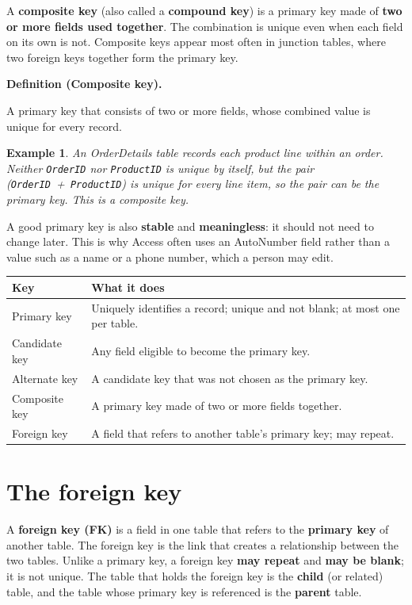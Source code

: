 \documentclass[11pt]{article}
\newtheorem{example}{Example}[section]
\newenvironment{definitionbox}[1]{%
  \par\noindent\textbf{Definition (#1).}\ \itshape
}{\par\vspace{0.3em}}
\begin{document}
A \textbf{composite key} (also called a \textbf{compound key}) is a primary key
made of \textbf{two or more fields used together}. The combination is unique
even when each field on its own is not. Composite keys appear most often in
junction tables, where two foreign keys together form the primary key.

\begin{definitionbox}{Composite key}
A primary key that consists of two or more fields, whose combined value is
unique for every record.
\end{definitionbox}

\begin{example}
An OrderDetails table records each product line within an order. Neither
\texttt{OrderID} nor \texttt{ProductID} is unique by itself, but the pair
(\texttt{OrderID}~+~\texttt{ProductID}) is unique for every line item, so the
pair can be the primary key. This is a composite key.
\end{example}

A good primary key is also \textbf{stable} and \textbf{meaningless}: it should
not need to change later. This is why Access often uses an AutoNumber field
rather than a value such as a name or a phone number, which a person may edit.

\begin{center}
\begin{tabular}{p{}p{}}
\toprule
\textbf{Key} & \textbf{What it does} \\
\midrule
Primary key & Uniquely identifies a record; unique and not blank; at most one per table. \\
Candidate key & Any field eligible to become the primary key. \\
Alternate key & A candidate key that was not chosen as the primary key. \\
Composite key & A primary key made of two or more fields together. \\
Foreign key & A field that refers to another table's primary key; may repeat. \\
\bottomrule
\end{tabular}
\end{center}

\section{The foreign key}
A \textbf{foreign key (FK)} is a field in one table that refers to the
\textbf{primary key} of another table. The foreign key is the link that
creates a relationship between the two tables. Unlike a primary key, a foreign
key \textbf{may repeat} and \textbf{may be blank}; it is not unique. The table
that holds the foreign key is the \textbf{child} (or related) table, and the
table whose primary key is referenced is the \textbf{parent} table.
\end{document}
